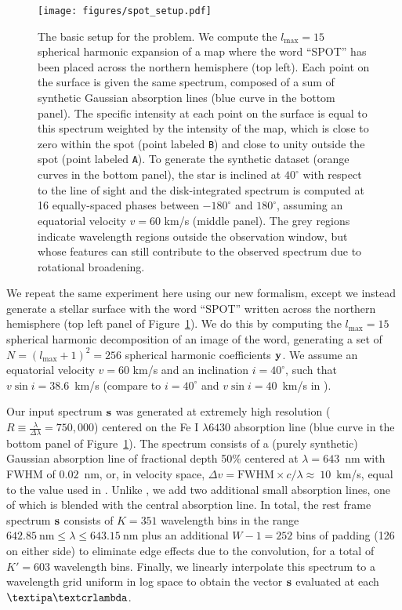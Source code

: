 \documentclass[modern]{aastex631}
\begin{document}
\begin{figure}[t!]
    \begin{centering}
        \texttt{[image: figures/spot\_setup.pdf]}
        \caption{%
            The basic setup for the \spot problem. 
            We compute the $l_\mathrm{max} = 15$ spherical harmonic expansion of a map where the word ``SPOT'' has been placed across the northern hemisphere (top left). 
            Each point on the surface is given the same spectrum, composed of a sum of synthetic Gaussian absorption lines (blue curve in the bottom panel).
            The specific intensity at each point on the surface is equal to this spectrum weighted by the intensity of the map, which is close to zero within the spot (point labeled \texttt{B}) and close to unity outside the spot (point labeled \texttt{A}).
            To generate the synthetic dataset (orange curves in the bottom panel), the star is inclined at $40^\circ$ with respect to the line of sight and the disk-integrated spectrum is computed at 16 equally-spaced phases between $-180^\circ$ and $180^\circ$, assuming an equatorial velocity $v = 60$ km/s (middle panel).
            The grey regions indicate wavelength regions outside the observation window, but whose features can still contribute to the observed spectrum due to rotational broadening.
        }
        \label{fig:spot_setup}
    \end{centering}
\end{figure}

We repeat the same experiment here using our new formalism, except we instead generate a stellar surface with the word ``SPOT'' written across the northern hemisphere (top left panel of Figure~\ref{fig:spot_setup}).
We do this by computing the $l_\mathrm{max} = 15$ spherical harmonic decomposition of an image of the word, generating a set of $N = (l_\mathrm{max} + 1)^2 = 256$ spherical harmonic coefficients ${\mathbf{y}}$. 
We assume an equatorial velocity $v = 60$ km/s and an inclination $i = 40^\circ$, such that $v \sin i = 38.6$~km/s (compare to $i = 40^\circ$ and $v \sin i = 40$~km/s in \citealt{Vogt1987}).

Our input spectrum ${\mathbf{s}}$ was generated at extremely high resolution
%
($R \equiv \frac{\lambda}{\Delta\lambda} = 750,000$) 
%
centered on the Fe I $\lambda 6430$ absorption line (blue curve in the bottom panel of Figure~\ref{fig:spot_setup}).
%
The spectrum consists of a (purely synthetic) Gaussian absorption line of fractional depth 50\% centered at $\lambda = 643$~nm with FWHM of $0.02$~nm, or, in velocity space, $\Delta v = \mathrm{FWHM} \times c / \lambda \approx~10$~km/s, equal to the value used in \citet{Vogt1987}. 
%
Unlike \citet{Vogt1987}, we add two additional small absorption lines, one of which is blended with the central absorption line.
In total, the rest frame spectrum ${\mathbf{s}}$ consists of 
%
$K = 351$ 
%
wavelength bins in the range $642.85~\mathrm{nm} \leq \lambda \leq 643.15~\mathrm{nm}$ plus an additional
%
$W - 1 = 252$ 
%
bins of padding 
%
(126 on either side) 
%
to eliminate edge effects due to the convolution, for a total of 
%
$K' = 603$
%
wavelength bins. 
Finally, we linearly interpolate this spectrum to a wavelength grid uniform in log space to obtain the vector ${\mathbf{s}}$ evaluated at each $\lnlam$.
\end{document}
